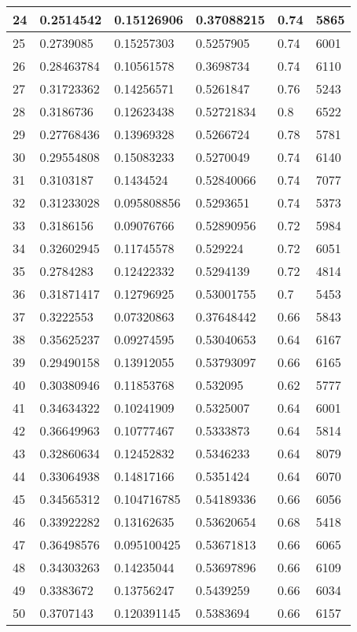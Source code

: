 \begin{longtable}{|l|l|l|l|l|l|}
24 & 0.2514542 & 0.15126906 & 0.37088215 & 0.74 & 5865 \\ \hline 
25 & 0.2739085 & 0.15257303 & 0.5257905 & 0.74 & 6001 \\ \hline 
26 & 0.28463784 & 0.10561578 & 0.3698734 & 0.74 & 6110 \\ \hline 
27 & 0.31723362 & 0.14256571 & 0.5261847 & 0.76 & 5243 \\ \hline 
28 & 0.3186736 & 0.12623438 & 0.52721834 & 0.8 & 6522 \\ \hline 
29 & 0.27768436 & 0.13969328 & 0.5266724 & 0.78 & 5781 \\ \hline 
30 & 0.29554808 & 0.15083233 & 0.5270049 & 0.74 & 6140 \\ \hline 
31 & 0.3103187 & 0.1434524 & 0.52840066 & 0.74 & 7077 \\ \hline 
32 & 0.31233028 & 0.095808856 & 0.5293651 & 0.74 & 5373 \\ \hline 
33 & 0.3186156 & 0.09076766 & 0.52890956 & 0.72 & 5984 \\ \hline 
34 & 0.32602945 & 0.11745578 & 0.529224 & 0.72 & 6051 \\ \hline 
35 & 0.2784283 & 0.12422332 & 0.5294139 & 0.72 & 4814 \\ \hline 
36 & 0.31871417 & 0.12796925 & 0.53001755 & 0.7 & 5453 \\ \hline 
37 & 0.3222553 & 0.07320863 & 0.37648442 & 0.66 & 5843 \\ \hline 
38 & 0.35625237 & 0.09274595 & 0.53040653 & 0.64 & 6167 \\ \hline 
39 & 0.29490158 & 0.13912055 & 0.53793097 & 0.66 & 6165 \\ \hline 
40 & 0.30380946 & 0.11853768 & 0.532095 & 0.62 & 5777 \\ \hline 
41 & 0.34634322 & 0.10241909 & 0.5325007 & 0.64 & 6001 \\ \hline 
42 & 0.36649963 & 0.10777467 & 0.5333873 & 0.64 & 5814 \\ \hline 
43 & 0.32860634 & 0.12452832 & 0.5346233 & 0.64 & 8079 \\ \hline 
44 & 0.33064938 & 0.14817166 & 0.5351424 & 0.64 & 6070 \\ \hline 
45 & 0.34565312 & 0.104716785 & 0.54189336 & 0.66 & 6056 \\ \hline 
46 & 0.33922282 & 0.13162635 & 0.53620654 & 0.68 & 5418 \\ \hline 
47 & 0.36498576 & 0.095100425 & 0.53671813 & 0.66 & 6065 \\ \hline 
48 & 0.34303263 & 0.14235044 & 0.53697896 & 0.66 & 6109 \\ \hline 
49 & 0.3383672 & 0.13756247 & 0.5439259 & 0.66 & 6034 \\ \hline 
50 & 0.3707143 & 0.120391145 & 0.5383694 & 0.66 & 6157 \\ \hline 
\end{longtable}